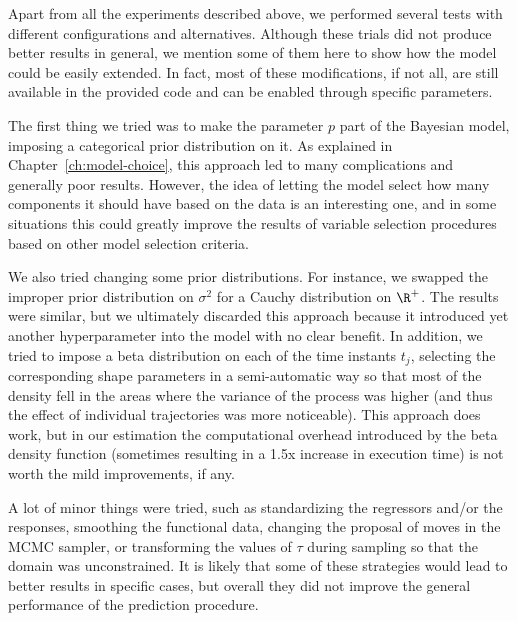 Apart from all the experiments described above, we performed several tests with different configurations and alternatives. Although these trials did not produce better results in general, we mention some of them here to show how the model could be easily extended. In fact, most of these modifications, if not all, are still available in the provided code and can be enabled through specific parameters.

The first thing we tried was to make the parameter \(p\) part of the Bayesian model, imposing a categorical prior distribution on it. As explained in Chapter~\ref{ch:model-choice}, this approach led to many complications and generally poor results. However, the idea of letting the model select how many components it should have based on the data is an interesting one, and in some situations this could greatly improve the results of variable selection procedures based on other model selection criteria.

We also tried changing some prior distributions. For instance, we swapped the improper prior distribution on \(\sigma^2\) for a Cauchy distribution on \(\R^+\). The results were similar, but we ultimately discarded this approach because it introduced yet another hyperparameter into the model with no clear benefit. In addition, we tried to impose a beta distribution on each of the time instants \(t_j\), selecting the corresponding shape parameters in a semi-automatic way so that most of the density fell in the areas where the variance of the process was higher (and thus the effect of individual trajectories was more noticeable). This approach does work, but in our estimation the computational overhead introduced by the beta density function (sometimes resulting in a 1.5x increase in execution time) is not worth the mild improvements, if any.

A lot of minor things were tried, such as standardizing the regressors and/or the responses, smoothing the functional data, changing the proposal of moves in the MCMC sampler, or transforming the values of \(\tau\) during sampling so that the domain was unconstrained. It is likely that some of these strategies would lead to better results in specific cases, but overall they did not improve the general performance of the prediction procedure.
